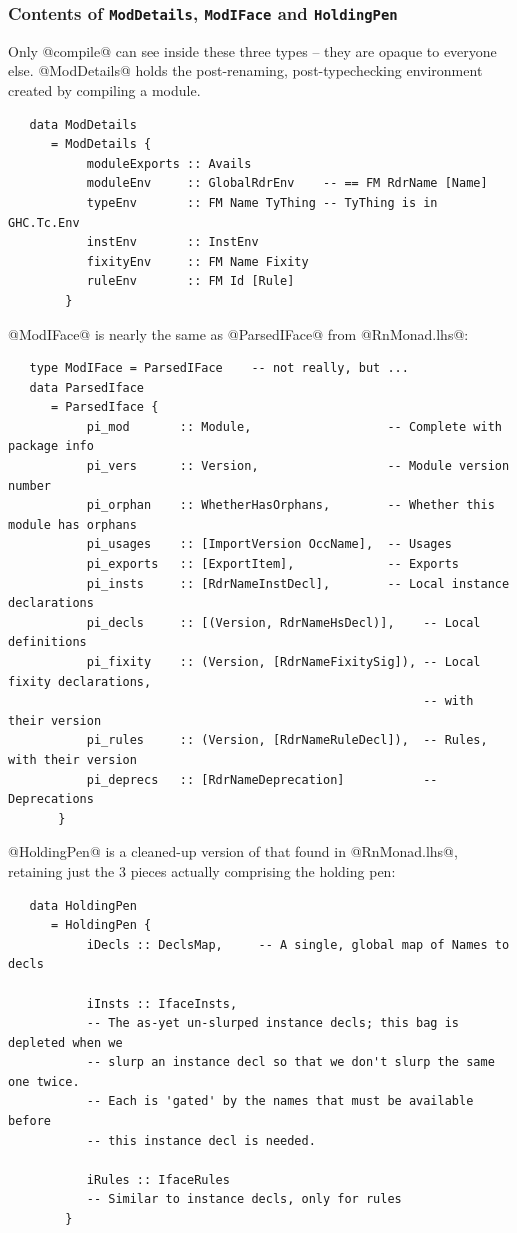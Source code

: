 \documentclass[11pt]{article}
\begin{document}
\subsubsection{Contents of \mbox{\tt ModDetails}, 
               \mbox{\tt ModIFace} and \mbox{\tt HoldingPen}}
Only @compile@ can see inside these three types -- they are opaque to
everyone else.  @ModDetails@ holds the post-renaming,
post-typechecking environment created by compiling a module.

\begin{verbatim}
   data ModDetails
      = ModDetails {
           moduleExports :: Avails
           moduleEnv     :: GlobalRdrEnv    -- == FM RdrName [Name]
           typeEnv       :: FM Name TyThing -- TyThing is in GHC.Tc.Env
           instEnv       :: InstEnv
           fixityEnv     :: FM Name Fixity
           ruleEnv       :: FM Id [Rule]
        }
\end{verbatim}

@ModIFace@ is nearly the same as @ParsedIFace@ from @RnMonad.lhs@:
\begin{verbatim}
   type ModIFace = ParsedIFace    -- not really, but ...
   data ParsedIface
      = ParsedIface {
           pi_mod       :: Module,                   -- Complete with package info
           pi_vers      :: Version,                  -- Module version number
           pi_orphan    :: WhetherHasOrphans,        -- Whether this module has orphans
           pi_usages    :: [ImportVersion OccName],  -- Usages
           pi_exports   :: [ExportItem],             -- Exports
           pi_insts     :: [RdrNameInstDecl],        -- Local instance declarations
           pi_decls     :: [(Version, RdrNameHsDecl)],    -- Local definitions
           pi_fixity    :: (Version, [RdrNameFixitySig]), -- Local fixity declarations, 
                                                          -- with their version
           pi_rules     :: (Version, [RdrNameRuleDecl]),  -- Rules, with their version
           pi_deprecs   :: [RdrNameDeprecation]           -- Deprecations
       }
\end{verbatim}

@HoldingPen@ is a cleaned-up version of that found in @RnMonad.lhs@, 
retaining just the 3 pieces actually comprising the holding pen:
\begin{verbatim}
   data HoldingPen 
      = HoldingPen {
           iDecls :: DeclsMap,     -- A single, global map of Names to decls

           iInsts :: IfaceInsts,
           -- The as-yet un-slurped instance decls; this bag is depleted when we
           -- slurp an instance decl so that we don't slurp the same one twice.
           -- Each is 'gated' by the names that must be available before
           -- this instance decl is needed.

           iRules :: IfaceRules
           -- Similar to instance decls, only for rules
        }
\end{verbatim}
\end{document}
